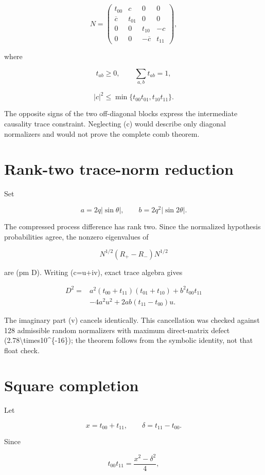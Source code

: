 \documentclass[11pt,a4paper,openany]{report}
\begin{document}
\[
N=
\begin{pmatrix}
t_{00}&c&0&0\\
\overline c&t_{01}&0&0\\
0&0&t_{10}&-c\\
0&0&-\overline c&t_{11}
\end{pmatrix},
\]

where

\[
t_{ab}\ge0,
\qquad
\sum_{a,b}t_{ab}=1,
\]

\[
|c|^2\le\min\{t_{00}t_{01},t_{10}t_{11}\}.
\]

The opposite signs of the two off-diagonal blocks express the intermediate causality trace constraint. Neglecting (c) would describe only diagonal normalizers and would not prove the complete comb theorem.

\section{Rank-two trace-norm reduction}

Set

\[
a=2q|\sin\theta|,
\qquad
b=2q^2|\sin2\theta|.
\]

The compressed process difference has rank two. Since the normalized hypothesis probabilities agree, the nonzero eigenvalues of

\[
N^{1/2}(R_+-R_-)N^{1/2}
\]

are (pm D). Writing (c=u+iv), exact trace algebra gives

\[
\begin{aligned}
D^2={}&a^2(t_{00}+t_{11})(t_{01}+t_{10})
+b^2t_{00}t_{11}\\
&-4a^2u^2+2ab(t_{11}-t_{00})u.
\end{aligned}
\]

The imaginary part (v) cancels identically. This cancellation was checked against 128 admissible random normalizers with maximum direct-matrix defect (2.78\textbackslash{}times10\textasciicircum{}\{-16\}); the theorem follows from the symbolic identity, not that float check.

\section{Square completion}

Let

\[
x=t_{00}+t_{11},
\qquad
\delta=t_{11}-t_{00}.
\]

Since

\[
t_{00}t_{11}=\frac{x^2-\delta^2}{4},
\]
\end{document}

